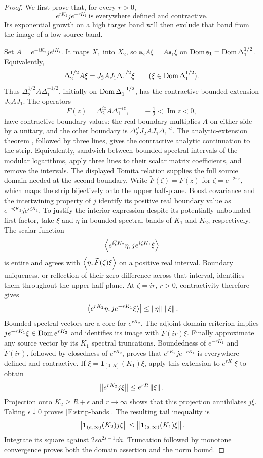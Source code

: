 \begin{proof}
We first prove that, for every $r>0$,
\begin{equation}\label{F:strip-exponential}
 e^{rK_2}j e^{-rK_1}\ \text{is everywhere defined and contractive}.
\end{equation}
Its exponential growth on a high target band will then exclude that band
from the image of a low source band.

Set $A=e^{-iK_2}je^{iK_1}$. It maps $X_1$ into $X_2$, so
$\mathfrak s_2A\xi=A\mathfrak s_1\xi$ on
$\operatorname{Dom}\mathfrak s_1=\operatorname{Dom}\Delta_1^{1/2}$. Equivalently,
\[
 \Delta_2^{1/2}A\xi
 =J_2AJ_1\Delta_1^{1/2}\xi
 \qquad(\xi\in\operatorname{Dom}\Delta_1^{1/2}).
\]
Thus $\Delta_2^{1/2}A\Delta_1^{-1/2}$, initially on
$\operatorname{Dom}\Delta_1^{-1/2}$, has the contractive bounded extension
$J_2AJ_1$. The operators
\[
 F(z)=\Delta_2^{iz}A\Delta_1^{-iz},\qquad
 -\tfrac12<\operatorname{Im}z<0,
\]
have contractive boundary values: the real boundary multiplies $A$
on either side by a unitary, and the other boundary is
$\Delta_2^{it}J_2AJ_1\Delta_1^{-it}$. The analytic-extension theorem
\cite[Theorem~2.3]{ArakiZsido2005}, followed by three lines, gives the
contractive analytic continuation to the strip. Equivalently, sandwich
between bounded spectral intervals of the modular logarithms, apply
three lines to their scalar matrix coefficients, and remove the
intervals. The displayed Tomita relation supplies the full source domain
needed at the second boundary.
Write $\widetilde F(\zeta)=F(z)$ for $\zeta=e^{-2\pi z}$, which
maps the strip bijectively onto the upper half-plane. Boost covariance
and the intertwining property of $j$ identify its positive real boundary
value as $e^{-i\zeta K_2}j e^{i\zeta K_1}$. To justify the interior
expression despite its potentially unbounded first factor, take
$\xi$ and $\eta$ in bounded spectral bands of $K_1$ and $K_2$,
respectively. The scalar function
\[
 \left\langle e^{i\overline\zeta K_2}\eta,j e^{i\zeta K_1}\xi\right\rangle
\]
is entire and agrees with
$\left\langle\eta,\widetilde F(\zeta)\xi\right\rangle$ on a positive real interval.
Boundary uniqueness, or reflection of their zero difference across
that interval, identifies them throughout the upper half-plane. At
$\zeta=ir$, $r>0$, contractivity therefore gives
\[
 \left|\left\langle e^{rK_2}\eta,j e^{-rK_1}\xi\right\rangle\right|
 \le\left\lVert\eta\right\rVert\,\left\lVert\xi\right\rVert.
\]
Bounded spectral vectors are a core for $e^{rK_2}$. The adjoint-domain
criterion implies $j e^{-rK_1}\xi\in\operatorname{Dom} e^{rK_2}$ and identifies its
image with $\widetilde F(ir)\xi$. Finally approximate any source vector
by its $K_1$ spectral truncations. Boundedness of $e^{-rK_1}$ and
$\widetilde F(ir)$, followed by closedness of $e^{rK_2}$, proves that
$e^{rK_2}je^{-rK_1}$ is everywhere defined and contractive.
If $\xi=\mathbf1_{[0,R]}(K_1)\xi$, apply this extension to
$e^{rK_1}\xi$ to obtain
\[
 \left\lVert e^{rK_2}j\xi\right\rVert\le e^{rR}\left\lVert\xi\right\rVert.
\]
Projection onto $K_2\ge R+\epsilon$ and $r\to\infty$ shows that this
projection annihilates $j\xi$. Taking $\epsilon\downarrow0$ proves
\eqref{F:strip-bands}. The resulting tail inequality is
\[
 \left\lVert\mathbf1_{(a,\infty)}(K_2)j\xi\right\rVert
 \le\left\lVert\mathbf1_{(a,\infty)}(K_1)\xi\right\rVert.
\]
Integrate its square against $2s a^{2s-1}\dd a$. Truncation followed by
monotone convergence proves both the domain assertion and the norm
bound.
\end{proof}

